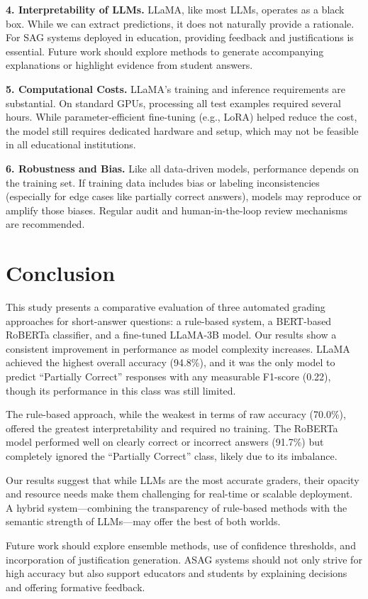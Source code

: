 \documentclass[11pt]{article}
\begin{document}
\textbf{4. Interpretability of LLMs.} LLaMA, like most LLMs, operates as a black box. While we can extract predictions, it does not naturally provide a rationale. For SAG systems deployed in education, providing feedback and justifications is essential. Future work should explore methods to generate accompanying explanations or highlight evidence from student answers.

\textbf{5. Computational Costs.} LLaMA’s training and inference requirements are substantial. On standard GPUs, processing all test examples required several hours. While parameter-efficient fine-tuning (e.g., LoRA) helped reduce the cost, the model still requires dedicated hardware and setup, which may not be feasible in all educational institutions.

\textbf{6. Robustness and Bias.} Like all data-driven models, performance depends on the training set. If training data includes bias or labeling inconsistencies (especially for edge cases like partially correct answers), models may reproduce or amplify those biases. Regular audit and human-in-the-loop review mechanisms are recommended.

\section{Conclusion}
This study presents a comparative evaluation of three automated grading approaches for short-answer questions: a rule-based system, a BERT-based RoBERTa classifier, and a fine-tuned LLaMA-3B model. Our results show a consistent improvement in performance as model complexity increases. LLaMA achieved the highest overall accuracy (94.8\%), and it was the only model to predict “Partially Correct” responses with any measurable F1-score (0.22), though its performance in this class was still limited.

The rule-based approach, while the weakest in terms of raw accuracy (70.0\%), offered the greatest interpretability and required no training. The RoBERTa model performed well on clearly correct or incorrect answers (91.7\%) but completely ignored the “Partially Correct” class, likely due to its imbalance.

Our results suggest that while LLMs are the most accurate graders, their opacity and resource needs make them challenging for real-time or scalable deployment. A hybrid system—combining the transparency of rule-based methods with the semantic strength of LLMs—may offer the best of both worlds.

Future work should explore ensemble methods, use of confidence thresholds, and incorporation of justification generation. ASAG systems should not only strive for high accuracy but also support educators and students by explaining decisions and offering formative feedback.
\end{document}
